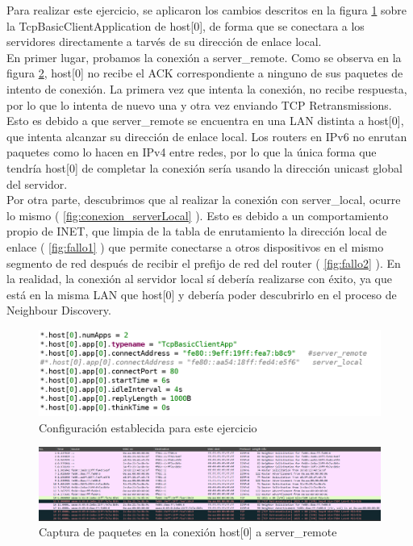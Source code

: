 Para realizar este ejercicio, se aplicaron los cambios descritos en la figura \ref{fig:conf_linklocalTCP} sobre la TcpBasicClientApplication de host[0], de forma que se conectara a los servidores directamente a tarvés de su dirección de enlace local.\\
En primer lugar, probamos la conexión a server\_remote. Como se observa en la figura \ref{fig:conexion_serverRemote}, host[0] no recibe el ACK correspondiente a ninguno de sus paquetes de intento de conexión. La primera vez que intenta la conexión, no recibe respuesta, por lo que lo intenta de nuevo una y otra vez enviando TCP Retransmissions. Esto es debido a que server\_remote se encuentra en una LAN distinta a host[0], que intenta alcanzar su dirección de enlace local. Los routers en IPv6 no enrutan paquetes como lo hacen en IPv4 entre redes, por lo que la única forma que tendría host[0] de completar la conexión sería usando la dirección unicast global del servidor.\\
Por otra parte, descubrimos que al realizar la conexión con server\_local, ocurre lo mismo ( \ref{fig:conexion_serverLocal} ). Esto es debido a un comportamiento propio de INET, que limpia de la tabla de enrutamiento la dirección local de enlace ( \ref{fig:fallo1} ) que permite conectarse a otros dispositivos en el mismo segmento de red después de recibir el prefijo de red del router ( \ref{fig:fallo2} ). En la realidad, la conexión al servidor local sí debería realizarse con éxito, ya que está en la misma LAN que host[0] y debería poder descubrirlo en el proceso de Neighbour Discovery.

\begin{figure}[H]
    \centering
    \includegraphics[width=135mm, scale=0.75]{imaxes/ejercicio2_7_1.png}
    \caption{Configuración establecida para este ejercicio}
    \label{fig:conf_linklocalTCP}
\end{figure}

\begin{figure}[H]
    \centering
    \includegraphics[width=135mm, scale=0.75]{imaxes/ejercicio2_7_3.png}
    \caption{Captura de paquetes en la conexión host[0] a server\_remote}
    \label{fig:conexion_serverRemote}
\end{figure}

